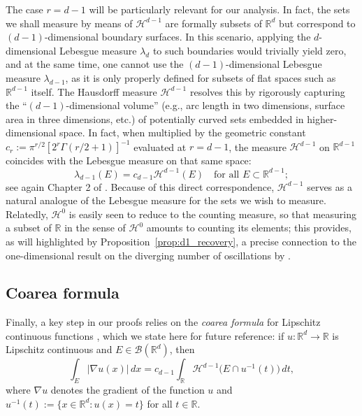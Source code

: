 \documentclass[12pt]{article}
\newcommand{\RR}{\mathbb{R}}
\begin{document}
The case $r=d-1$ will be particularly relevant for our analysis. In fact, the sets we shall measure by means of $\mathcal H^{d-1}$ are formally subsets of $\RR^d$ but
correspond to $(d-1)$-dimensional boundary surfaces. In this scenario, applying the $d$-dimensional Lebesgue measure $\lambda_d$ to such
boundaries would trivially yield zero, and at the same time, one cannot use the $(d-1)$-dimensional
Lebesgue measure $\lambda_{d-1}$, as it is only properly defined for subsets of flat spaces such as
$\RR^{d-1}$ itself. The Hausdorff measure $\mathcal{H}^{d-1}$ resolves this by rigorously capturing the ``$(d-1)$-dimensional volume'' (e.g., arc length in two dimensions, surface area in three dimensions, etc.) of
potentially curved sets embedded in higher-dimensional space. In fact, when multiplied by
the geometric constant
%
$c_{r} := \pi^{r/2}[2^{r}\Gamma(r/2 + 1)]^{-1}$
%
evaluated at $r=d-1$, the measure $\mathcal H^{d-1}$ on $\mathbb R^{d-1}$
coincides with the Lebesgue measure on that same space:
\begin{equation*}
\lambda_{d-1}(E)=c_{d-1}\mathcal{H}^{d-1}(E) \quad \text{for all } E \subset \RR^{d-1};
\end{equation*}
%
see again Chapter 2 of \citet{evans2015measure}. Because of this direct correspondence,
$\mathcal{H}^{d-1}$ serves as a natural analogue of the Lebesgue measure for the
sets we wish to measure. Relatedly, $\mathcal H^{0}$ is easily seen to reduce to the
counting measure, so that measuring a subset of $\RR$ in the sense of $\mathcal H^0$ amounts to counting its
elements; this provides, as will highlighted by Proposition~\ref{prop:d1_recovery}, a precise connection to the one-dimensional result on the diverging number of oscillations by \cite{bariletto2025identifiability}.

\subsection{Coarea formula}

Finally, a key step in our proofs relies on the \emph{coarea formula} for Lipschitz continuous functions
\citep[see Chapter 3 of][]{evans2015measure}, which we state here for future reference: if
$u : \RR^d \to \RR$ is Lipschitz continuous and $E \in \mathcal B(\RR^d)$, then
\begin{equation}\label{eq:coarea}
\int_E |\nabla u(x)| \, dx = c_{d-1}\int_{\RR} \mathcal{H}^{d-1}\bigl(E \cap u^{-1}(t)\bigr)\,dt,
\end{equation}
%
where $\nabla u$ denotes the gradient of the function $u$ and $u^{-1}(t):=\{x\in\mathbb R^d : u(x)=t\}$ for all $t\in\mathbb R$.
\end{document}
